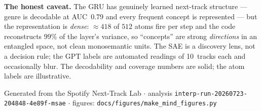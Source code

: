 \documentclass[11pt]{article}
\begin{document}
\textbf{The honest caveat.} The GRU has genuinely learned next-track structure ---
genre is decodable at AUC~0.79 and every frequent concept is represented --- but the
representation is \emph{dense}: $\approx 418$ of $512$ atoms fire per step and the
code reconstructs $99\%$ of the layer's variance, so ``concepts'' are strong
\emph{directions} in an entangled space, not clean monosemantic units. The SAE is a
discovery lens, not a decision rule; the GPT labels are automated readings of
10~tracks each and occasionally blur. The decodability and coverage numbers are
solid; the atom labels are illustrative.

\vfill
\begin{center}\small
Generated from the Spotify Next-Track Lab
$\cdot$ analysis \texttt{interp-run-20260723-204848-4e89f-msae}
$\cdot$ figures: \texttt{docs/figures/make\_mind\_figures.py}
\end{center}
\end{document}
